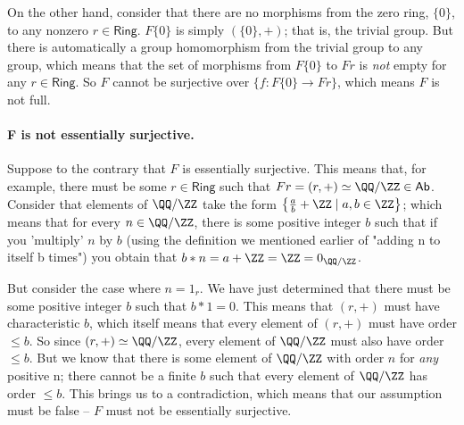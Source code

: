 \documentclass[main.tex]{subfiles}
\begin{document}
	On the other hand, consider that there are no morphisms from the zero ring, \(\{0\}\), to any nonzero \(r \in \textsf{Ring}\). \(F\{0\}\) is simply \((\{0\}, +)\); that is, the trivial group. But there is automatically a group homomorphism from the trivial group to any group, which means that the set of morphisms from \(F\{0\}\) to \(Fr\) is \textit{not} empty for any \(r \in \textsf{Ring}\). So \(F\) cannot be surjective over \(\{f : F\{0\} \to Fr\}\), which means \(F\) is not full.
	
	\paragraph{F is not essentially surjective.}	
	
	Suppose to the contrary that \(F\) is essentially surjective. This means that, for example, there must be some \(r \in \textsf{Ring}\) such that \(Fr = (r, +) \simeq \QQ/\ZZ \in \textsf{Ab}\). Consider that elements of \(\QQ/\ZZ\) take the form \(\left\{\frac{a}{b} + \ZZ \mid a, b \in \ZZ\right\}\); which means that for every \(n \in \QQ/\ZZ\), there is some positive integer \(b\) such that if you 'multiply' \(n\) by \(b\) (using the definition we mentioned earlier of "adding n to itself b times") you obtain that \(b*n = a + \ZZ = \ZZ = 0_{\QQ/\ZZ}\).
	
	
	But consider the case where \(n = 1_r\). We have just determined that there must be some positive integer \(b\) such that \(b*1 = 0\). This means that \((r, +)\) must have characteristic \(b\), which itself means that every element of \((r, +)\) must have order \(\leq b\). So since \((r, +) \simeq \QQ/\ZZ\), every element of \(\QQ/\ZZ\) must also have order \(\leq b\). But we know that there is some element of \(\QQ/\ZZ\) with order \(n\) for \textit{any} positive n; there cannot be a finite \(b\) such that every element of \(\QQ/\ZZ\) has order \(\leq b\). This brings us to a contradiction, which means that our assumption must be false -- \(F\) must not be essentially surjective.
	
	
	
	
\end{document}
